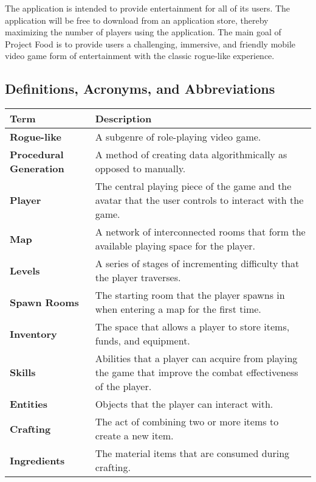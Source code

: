 \documentclass[12pt, titlepage]{article}
\begin{document}
  The application is intended to provide entertainment for all of its users. The application will be free to download from an application store, thereby maximizing the number of players using the application. The main goal of Project Food is to provide users a challenging, immersive, and friendly mobile video game form of entertainment with the classic rogue-like experience.
  \subsection{Definitions, Acronyms, and Abbreviations}
  { %
  \renewcommand{\arraystretch}{2.0}
  \begin{tabu} to 0.8\textwidth { | X[2.0] | X[5] | }
   \hline
   \textbf{Term} & Description\\
   \hline
   \hline
   \textbf{Rogue-like}  & A subgenre of role-playing video game. \\
   \hline
   \textbf{Procedural Generation} & A method of creating data algorithmically as opposed to manually.\\
   \hline
   \textbf{Player} & The central playing piece of the game and the avatar that the user controls to interact with the game.\\
   \hline
   \textbf{Map} & A network of interconnected rooms that form the available playing space for the player.\\
   \hline
   \textbf{Levels} & A series of stages of incrementing difficulty that the player traverses.\\
   \hline
   \textbf{Spawn Rooms} & The starting room that the player spawns in when entering a map for the first time.\\
   \hline
   \textbf{Inventory} & The space that allows a player to store items, funds, and equipment.\\
   \hline
   \textbf{Skills} & Abilities that a player can acquire from playing the game that improve the combat effectiveness of the player.\\
   \hline
   \textbf{Entities} & Objects that the player can interact with.\\
   \hline
   \textbf{Crafting} & The act of combining two or more items to create a new item.\\
   \hline
   \textbf{Ingredients} & The material items that are consumed during crafting.\\
   \hline
  \end{tabu}
  }
\end{document}
